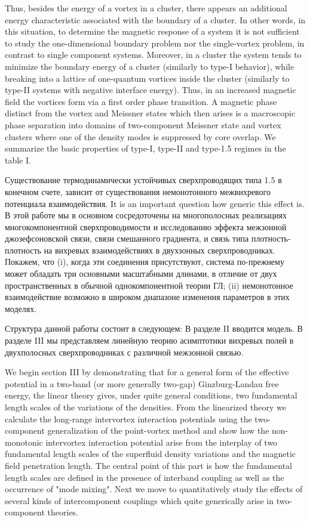 Thus, besides the energy of a vortex in a cluster, there appears an additional 
energy characteristic associated with the boundary of a cluster. In other 
words, in this situation, to determine the magnetic response of a system it is 
not sufficient to study the one-dimensional boundary problem nor the 
single-vortex problem, in contrast to single component systems. Moreover, in a 
cluster the system tends to minimize the boundary energy of a cluster 
(similarly to type-I behavior), while breaking into a lattice of one-quantum 
vortices inside the cluster (similarly to type-II systems with negative 
interface energy). Thus, in an increased magnetic field the vortices form via 
a first order phase transition. A magnetic phase distinct from the vortex and 
Meissner states which then arises is a macroscopic phase separation into 
domains of two-component Meissner state and vortex clusters where one of the 
density modes is suppressed by core overlap. We summarize the basic properties 
of type-I, type-II and type-1.5 regimes in the table I.

Существование термодинамически устойчивых сверхпроводящих типа 1.5 в конечном 
счете, зависит от существования немонотонного межвихревого потенциала 
взаимодействия. It is an important question how generic this effect is. В этой 
работе мы в основном сосредоточены на многополосных реализациях 
многокомпонентной сверхпроводимости и исследованию эффекта межзонной 
джозефсоновской связи, связи смешанного градиента, и связь типа 
плотность-плотность на вихревых взаимодействиях в двухзонных сверхпроводниках. 
Покажем, что (i), когда эти соединения присутствуют, система по-прежнему может 
обладать три основными масштабными длинами, в отличие от двух пространственных 
в обычной однокомпонентной теории ГЛ; (ii) немонотонное взаимодействие 
возможно в широком диапазоне изменения параметров в этих моделях.

Структура данной работы состоит в следующем: В разделе II вводится модель. 
В разделе III мы представляем линейную теорию асимптотики вихревых полей в 
двухполосных сверхпроводниках с различной межзонной связью.

We begin section III by demonstrating that for a general form of the effective 
potential in a two-band (or more generally two-gap) Ginzburg-Landau free 
energy, the linear theory gives, under quite general conditions, two 
fundamental length scales of the variations of the densities. From the 
linearized theory we calculate the long-range intervortex interaction 
potentials using the two-component generalization of the point-vortex method 
\cite{bib:19} and show how the non-monotonic intervortex interaction potential 
arise from the interplay of two fundamental length scales of the superfluid 
density variations and the magnetic field penetration length. The central 
point of this part is how the fundamental length scales are defined in the 
presence of interband coupling as well as the occurrence of "mode mixing". 
Next we move to quantitatively study the effects of several kinds of 
intercomponent couplings which quite generically arise in two-component 
theories.

